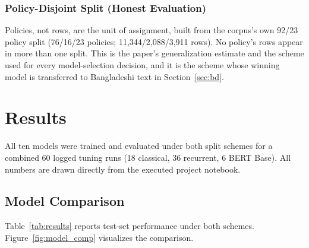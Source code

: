 \documentclass[11pt]{article}
\begin{document}
\subsubsection{Policy-Disjoint Split (Honest Evaluation)}

Policies, not rows, are the unit of assignment, built from the corpus's own 92/23 policy split (76/16/23 policies; 11,344/2,088/3,911 rows). No policy's rows appear in more than one split. This is the paper's generalization estimate and the scheme used for every model-selection decision, and it is the scheme whose winning model is transferred to Bangladeshi text in Section~\ref{sec:bd}.

\section{Results}

All ten models were trained and evaluated under both split schemes for a combined 60 logged tuning runs (18 classical, 36 recurrent, 6 BERT Base). All numbers are drawn directly from the executed project notebook.

\subsection{Model Comparison}

Table~\ref{tab:results} reports test-set performance under both schemes. Figure~\ref{fig:model_comp} visualizes the comparison.
\end{document}
